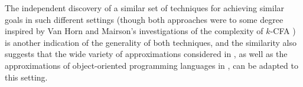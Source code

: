 The independent discovery of a similar set of techniques for achieving
similar goals in such different settings (though both approaches were
to some degree inspired by Van Horn and Mairson's investigations of
the complexity of $k$-CFA \cite{cite}) is another indication of the
generality of both techniques, and the similarity also suggests that
the wide variety of approximations considered in \cite{cite}, as well
as the approximations of object-oriented programming languages in
\cite{cite}, can be adapted to this setting.
